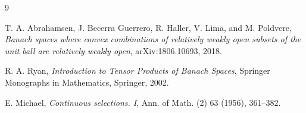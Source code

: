 \documentclass[11pt]{article}
\begin{document}
\begin{thebibliography}{9}

T. A. Abrahamsen, J. Becerra Guerrero, R. Haller, V. Lima,
and M. Poldvere,
\emph{Banach spaces where convex combinations of relatively weakly open
subsets of the unit ball are relatively weakly open},
arXiv:1806.10693, 2018.

R. A. Ryan,
\emph{Introduction to Tensor Products of Banach Spaces},
Springer Monographs in Mathematics, Springer, 2002.

E. Michael,
\emph{Continuous selections. I},
Ann. of Math. (2) 63 (1956), 361--382.

\end{thebibliography}
\end{document}
